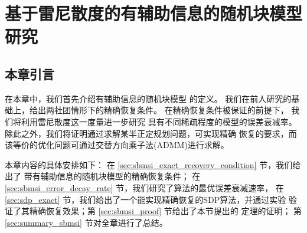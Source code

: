 \chapter{基于雷尼散度的有辅助信息的随机块模型研究}
\label{chap:sbmsi}
\section{本章引言}
在本章中，我们首先介绍有辅助信息的随机块模型
的定义。
我们在前人研究的基础上，给出两社团情形下的精确恢复条件。
在精确恢复条件被保证的前提下，
我们将利用雷尼散度这一度量进一步研究
具有不同稀疏程度的模型的误差衰减率。
除此之外，我们将证明通过求解某半正定规划问题，可实现精确
恢复的要求，而该等价的优化问题可通过交替方向乘子法(ADMM)进行求解。

本章内容的具体安排如下：
在 \ref{sec:sbmsi_exact_recovery_condition} 节，我们给出了
带有辅助信息的随机块模型的精确恢复条件；
在 \ref{sec:sbmsi_error_decay_rate} 节，我们研究了算法的最优误差衰减速率，
在 \ref{sec:sdp_exact} 节，我们给出了一个能实现精确恢复的SDP算法，并通过实验
验证了其精确恢复效果；第 \ref{sec:sbmsi_proof} 节给出了本节提出的
定理的证明；
第 \ref{sec:summary_sbmsi} 节对全章进行了总结。

